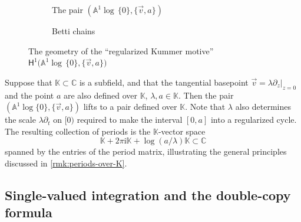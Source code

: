 \documentclass[JEP,XML,SOM,Unicode,NoFloatCountersInSection,published]{cedram}
\let\oldbullet\bullet
\renewcommand{\bullet}{{\raisebox{1pt}{$\scriptscriptstyle\oldbullet$}}}
\newcommand{\rbirac}[1]{\bigl(#1\bigr)}
\newcommand{\bcoH}[2][\bullet]{\mathsf{H}^{#1}\rbirac{#2}}
\theoremstyle{definition}
\theoremstyle{remark}
\newenvironment{remark}
  {\pushQED{\qed}\renewcommand{\qedsymbol}{$\lozenge$}\remarkx}
  {\popQED\endremarkx}
\newcommand{\CC}{\mathbb{C}}
\newcommand{\KK}{\mathbb{K}}
\newcommand{\AF}{\mathbb{A}}
\newcommand{\logcyl}{\AF^1 \log\, \{0\}}
\newcommand{\iu}{\mathrm{i}}
\newcommand{\ipi}{\pi\iu }
\newcommand{\tipi}{2\ipi}
\newcommand{\cvf}[1]{\partial_{#1}}
\begin{document}
\begin{figure}
\begin{subfigure}{0.4\textwidth}
\centering{}
\caption{The pair $(\logcyl,\{\vec v,a\})$}
\end{subfigure}
\begin{subfigure}{0.4\textwidth}
\caption{Betti chains}
\end{subfigure}
\caption{The geometry of the ``regularized Kummer motive''\\ $\bcoH[1]{\logcyl,\{\vec v,a\}}$}
\label{fig:Kummer-Betti}
\end{figure}

\begin{remark}\label{rmk:kummer-over-K}
Suppose that $\KK \subset \CC$ is a subfield, and that the tangential basepoint $\vec v = \lambda \cvf{z}|_{z=0}$ and the point $a$ are also defined over $\KK$, \ie $\lambda,a \in \KK$. Then the pair $(\AF^1\log \{0\},\{\vec v,a\})$ lifts to a pair defined over $\KK$. Note that $\lambda$ also determines the scale $\lambda\cvf{t}$ on $[0)$ required to make the interval $[0,a]$ into a regularized cycle. The resulting collection of periods is the $\KK$-vector space
\[
\KK + \tipi\KK + \log(a/\lambda) \KK \subset \CC
\]
spanned by the entries of the period matrix, illustrating the general principles discussed in \autoref{rmk:periods-over-K}.
\end{remark}

\subsection{Single-valued integration and the double-copy formula}
\end{document}
